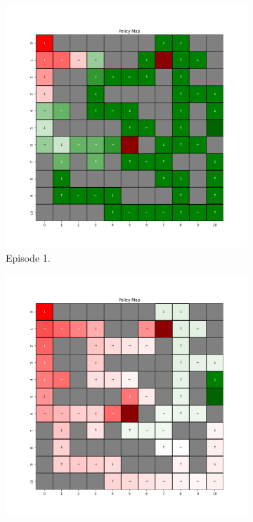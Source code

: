 \documentclass{assignment}
\begin{document}
\begin{figure}[H]
    \begin{subfigure}{0.3\textwidth}
        \includegraphics[width=\textwidth]{figures/policy_q/alpha_sweep/policy_alpha_0.001_gamma_0.95_epsilon_0.2_iteration_1.png}
    \caption{Episode 1.}
    \end{subfigure}\hfill
    \begin{subfigure}{0.3\textwidth}
        \includegraphics[width=\textwidth]{figures/policy_q/alpha_sweep/policy_alpha_0.001_gamma_0.95_epsilon_0.2_iteration_50.png}

\end{subfigure}
\end{figure}
\end{document}
